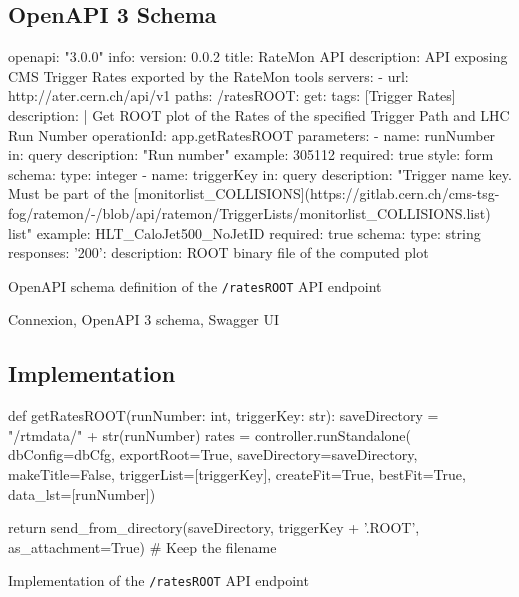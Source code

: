 \subsection{OpenAPI 3 Schema}

\begin{listing}[ht]
\begin{yamlcode}
openapi: "3.0.0"
info:
  version: 0.0.2
  title: RateMon API
  description: API exposing CMS Trigger Rates exported by the RateMon tools
servers:
  - url: http://ater.cern.ch/api/v1
paths:
  /ratesROOT:
    get:
      tags: [Trigger Rates]
      description: |
        Get ROOT plot of the Rates of the specified Trigger Path and LHC Run Number
      operationId: app.getRatesROOT
      parameters:
        - name: runNumber
          in: query
          description: "Run number"
          example: 305112
          required: true
          style: form
          schema:
            type: integer
        - name: triggerKey
          in: query
          description: "Trigger name key. Must be part of the [monitorlist_COLLISIONS](https://gitlab.cern.ch/cms-tsg-fog/ratemon/-/blob/api/ratemon/TriggerLists/monitorlist_COLLISIONS.list) list"
          example: HLT_CaloJet500_NoJetID
          required: true
          schema:
            type: string
      responses:
        '200':
          description: ROOT binary file of the computed plot
\end{yamlcode}
\caption{OpenAPI schema definition of the \texttt{/ratesROOT} API endpoint}
\end{listing}

Connexion, OpenAPI 3 schema, Swagger UI

\subsection{Implementation}

\begin{listing}[ht]
\begin{pythoncode}
def getRatesROOT(runNumber: int, triggerKey: str):
    saveDirectory = "/rtmdata/" + str(runNumber)
    rates = controller.runStandalone(
                         dbConfig=dbCfg,
                         exportRoot=True,
                         saveDirectory=saveDirectory,
                         makeTitle=False,
                         triggerList=[triggerKey],
                         createFit=True,
                         bestFit=True,
                         data_lst=[runNumber])

    return send_from_directory(saveDirectory,
                               triggerKey + '.ROOT',
                               as_attachment=True) # Keep the filename
\end{pythoncode}
\caption{Implementation of the \texttt{/ratesROOT} API endpoint}
\end{listing}

